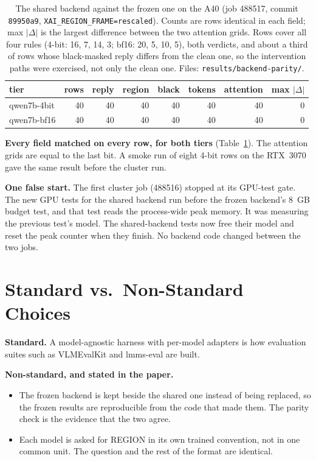 \begin{table}[tbp]
\centering
\small
\begin{tabular}{lrrrrrrr}
\toprule
\textbf{tier} & \textbf{rows} & \textbf{reply} & \textbf{region} & \textbf{black} & \textbf{tokens} &
\textbf{attention} & \textbf{max $|\Delta|$} \\
\midrule
qwen7b-4bit & 40 & 40 & 40 & 40 & 40 & 40 & 0 \\
qwen7b-bf16 & 40 & 40 & 40 & 40 & 40 & 40 & 0 \\
\bottomrule
\end{tabular}
\caption{The shared backend against the frozen one on the A40 (job 488517, commit \texttt{89950a9},
\texttt{XAI\_REGION\_FRAME=rescaled}). Counts are rows identical in each field; max $|\Delta|$ is the
largest difference between the two attention grids. Rows cover all four rules (4-bit: 16, 7, 14, 3;
bf16: 20, 5, 10, 5), both verdicts, and about a third of rows whose black-masked reply differs from the
clean one, so the intervention paths were exercised, not only the clean one.
Files: \texttt{results/backend-parity/}.}
\label{tab:s29}
\end{table}

\textbf{Every field matched on every row, for both tiers} (Table~\ref{tab:s29}). The attention grids are
equal to the last bit. A smoke run of eight 4-bit rows on the RTX~3070 gave the same result before the
cluster run.

\textbf{One false start.} The first cluster job (488516) stopped at its GPU-test gate. The new GPU tests
for the shared backend run before the frozen backend's 8~GB budget test, and that test reads the
process-wide peak memory. It was measuring the previous test's model. The shared-backend tests now free
their model and reset the peak counter when they finish. No backend code changed between the two jobs.

\section{Standard vs.\ Non-Standard Choices}

\textbf{Standard.} A model-agnostic harness with per-model adapters is how evaluation suites such as
VLMEvalKit and lmms-eval are built.

\textbf{Non-standard, and stated in the paper.}
\begin{itemize}
\item The frozen backend is kept beside the shared one instead of being replaced, so the frozen results
are reproducible from the code that made them. The parity check is the evidence that the two agree.
\item Each model is asked for REGION in its own trained convention, not in one common unit. The question
and the rest of the format are identical.
\end{itemize}


